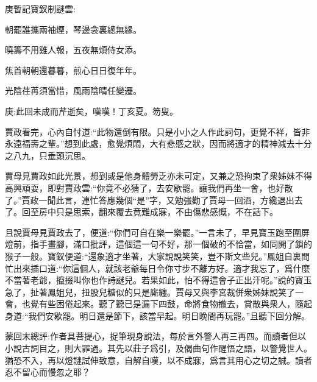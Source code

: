 \begin{poem}
    \begin{note} 庚暫記寶釵制謎雲:\end{note}

    \begin{pl} 朝罷誰攜兩袖煙，琴邊衾裏總無緣。\end{pl}

    \begin{pl} 曉籌不用雞人報，五夜無煩侍女添。\end{pl}

    \begin{pl} 焦首朝朝還暮暮，煎心日日復年年。\end{pl}

    \begin{pl} 光陰荏苒須當惜，風雨陰晴任變遷。\end{pl}
\end{poem}


\begin{parag}
    \begin{note}庚:此回未成而芹逝矣，嘆嘆！丁亥夏。笏叟。\end{note}
\end{parag}


\begin{parag}
    賈政看完，心內自忖道:“此物還倒有限。只是小小之人作此詞句，更覺不祥，皆非永遠福壽之輩。”想到此處，愈覺煩悶，大有悲慼之狀，因而將適才的精神減去十分之八九，只垂頭沉思。
\end{parag}


\begin{parag}
    賈母見賈政如此光景，想到或是他身體勞乏亦未可定，又兼之恐拘束了衆姊妹不得高興頑耍，即對賈政雲:“你竟不必猜了，去安歇罷。讓我們再坐一會，也好散了。”賈政一聞此言，連忙答應幾個“是”字，又勉強勸了賈母一回酒，方纔退出去了。回至房中只是思索，翻來覆去竟難成寐，不由傷悲感慨，不在話下。
\end{parag}


\begin{parag}
    且說賈母見賈政去了，便道:“你們可自在樂一樂罷。”一言未了，早見寶玉跑至圍屏燈前，指手畫腳，滿口批評，這個這一句不好，那一個破的不恰當，如同開了鎖的猴子一般。寶釵便道:“還象適才坐著，大家說說笑笑，豈不斯文些兒。”鳳姐自裏間忙出來插口道:“你這個人，就該老爺每日令你寸步不離方好。適才我忘了，爲什麼不當著老爺，攛掇叫你也作詩謎兒。若果如此，怕不得這會子正出汗呢。”說的寶玉急了，扯著鳳姐兒，扭股兒糖似的只是廝纏。賈母又與李宮裁併衆姊妹說笑了一會，也覺有些困倦起來。聽了聽已是漏下四鼓，命將食物撤去，賞散與衆人，隨起身道:“我們安歇罷。明日還是節下，該當早起。明日晚間再玩罷。”且聽下回分解。
\end{parag}


\begin{parag}
    \begin{note}蒙回末總評:作者具菩提心，捉筆現身說法，每於言外警人再三再四。而讀者但以小說古詞目之，則大罪過。其先以莊子爲引，及偈曲句作醒悟之語，以警覺世人。猶恐不入，再以燈謎試伸致意，自解自嘆，以不成寐，爲言其用心之切之誠。讀者忍不留心而慢忽之耶？\end{note}
\end{parag}

